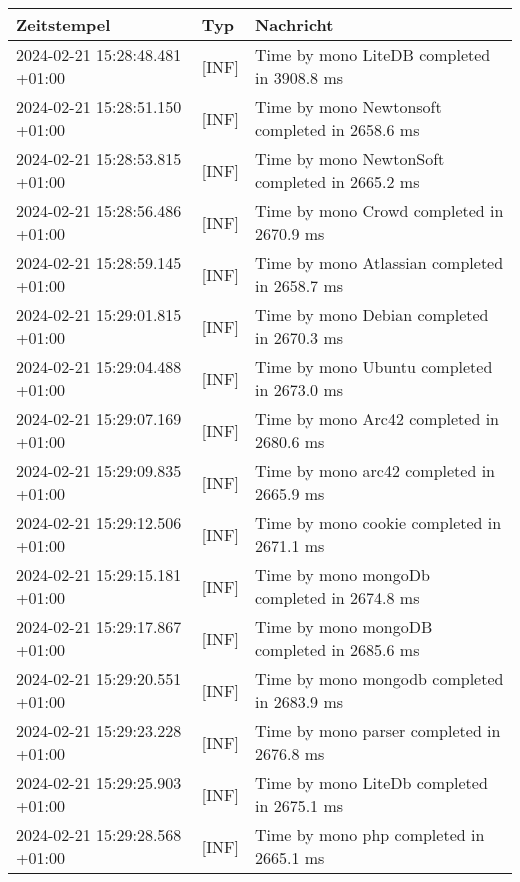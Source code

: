         {
            {\small
                \begin{tabularx}{\textwidth}{|l|l|X|}
                    \hline
                    \textbf{Zeitstempel} & \textbf{Typ} & \textbf{Nachricht} \\
                    \hline
                    \endhead
                    2024-02-21 15:28:48.481 +01:00 & [INF] & Time by mono LiteDB completed in 3908.8 ms \\
                    2024-02-21 15:28:51.150 +01:00 & [INF] & Time by mono Newtonsoft completed in 2658.6 ms \\
                    2024-02-21 15:28:53.815 +01:00 & [INF] & Time by mono NewtonSoft completed in 2665.2 ms \\
                    2024-02-21 15:28:56.486 +01:00 & [INF] & Time by mono Crowd completed in 2670.9 ms \\
                    2024-02-21 15:28:59.145 +01:00 & [INF] & Time by mono Atlassian completed in 2658.7 ms \\
                    2024-02-21 15:29:01.815 +01:00 & [INF] & Time by mono Debian completed in 2670.3 ms \\
                    2024-02-21 15:29:04.488 +01:00 & [INF] & Time by mono Ubuntu completed in 2673.0 ms \\
                    2024-02-21 15:29:07.169 +01:00 & [INF] & Time by mono Arc42 completed in 2680.6 ms \\
                    2024-02-21 15:29:09.835 +01:00 & [INF] & Time by mono arc42 completed in 2665.9 ms \\
                    2024-02-21 15:29:12.506 +01:00 & [INF] & Time by mono cookie completed in 2671.1 ms \\
                    2024-02-21 15:29:15.181 +01:00 & [INF] & Time by mono mongoDb completed in 2674.8 ms \\
                    2024-02-21 15:29:17.867 +01:00 & [INF] & Time by mono mongoDB completed in 2685.6 ms \\
                    2024-02-21 15:29:20.551 +01:00 & [INF] & Time by mono mongodb completed in 2683.9 ms \\
                    2024-02-21 15:29:23.228 +01:00 & [INF] & Time by mono parser completed in 2676.8 ms \\
                    2024-02-21 15:29:25.903 +01:00 & [INF] & Time by mono LiteDb completed in 2675.1 ms \\
                    2024-02-21 15:29:28.568 +01:00 & [INF] & Time by mono php completed in 2665.1 ms \\

\end{tabularx}}}
